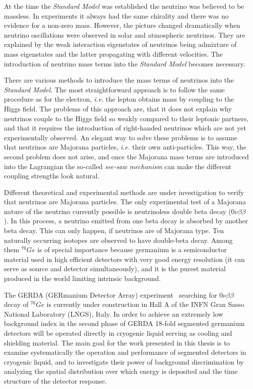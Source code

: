 At the time the \emph{Standard Model} was established the neutrino was
believed to be massless. In experiments it always had the same
chirality and there was no evidence for a non-zero mass. However, the
picture changed dramatically when neutrino oscillations were observed
in solar and atmospheric neutrinos. They are explained by the weak
interaction eigenstates of neutrinos being admixture of mass
eigenstates and the latter propagating with different velocities. The
introduction of neutrino mass terms into the \emph{Standard Model}
becomes necessary.

There are various methods to introduce the mass terms of neutrinos
into the \emph{Standard Model}. The most straightforward approach is
to follow the same procedure as for the electron, \textit{i.e.} the
lepton obtains mass by coupling to the Higgs field. The problems of
this approach are, that it does not explain why neutrinos couple to
the Higgs field so weakly compared to their leptonic partners, and
that it requires the introduction of right-handed neutrinos which are
not yet experimentally observed. An elegant way to solve these
problems is to assume that neutrinos are Majorana particles,
\textit{i.e.} their own anti-particles. This way, the second problem
does not arise, and once the Majorana mass terms are introduced into
the Lagrangian the so-called \emph{see-saw mechanism} can make the
different coupling strengths look natural.

Different theoretical and experimental methods are under investigation to verify that neutrinos are Majorana particles. The only experimental test of a Majorana nature of the neutrino currently possible is neutrinoless double beta decay ($0\nu\beta\beta$). In this process, a neutrino emitted from one beta decay is absorbed by another beta decay. This can only happen, if neutrinos are of Majorana type. Ten naturally occurring isotopes are observed to have double-beta decay. Among them $^{76}Ge$ is of special importance because germanium is a semiconductor material used in high efficient detectors with very good energy resolution (it can serve as source and detector simultaneously), and it is the purest material produced in the world limiting intrinsic background.

The GERDA (GERmanium Detector Array) experiment~\cite{Abt04, Sch05} searching for $0\nu\beta\beta$ decay of $^{76}Ge$ is currently under construction in Hall A of the INFN Gran Sasso National Laboratory (LNGS), Italy. In order to achieve an extremely low background index in the second phase of GERDA 18-fold segmented germanium detectors will be operated directly in cryogenic liquid serving as cooling and shielding material. The main goal for the work presented in this thesis is to examine systematically the operation and performance of segmented detectors in cryogenic liquid, and to investigate their power of background discrimination by analyzing the spatial distribution over which energy is deposited and the time structure of the detector response.

